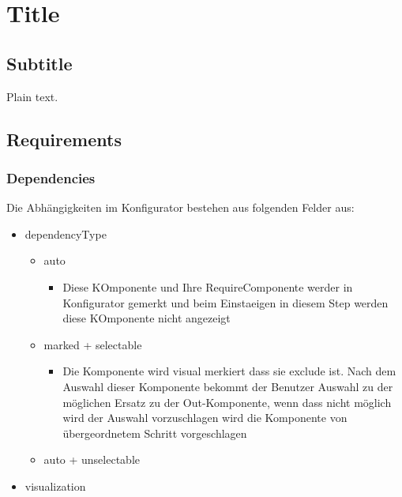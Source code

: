 \documentclass{article}
\begin{document}
\section{Title}

\subsection{Subtitle}

Plain text.

\subsection{Requirements}

\subsubsection{Dependencies}

Die Abhängigkeiten im Konfigurator bestehen aus folgenden Felder aus:

\begin{itemize} 
\item dependencyType
\begin{itemize}
  \item auto 
    \begin{itemize}
      \item Diese KOmponente und Ihre RequireComponente werder in Konfigurator
      gemerkt und beim Einstaeigen in diesem Step werden diese KOmponente nicht
      angezeigt
    
    \end{itemize}
  \item marked + selectable
  \begin{itemize}
    \item Die Komponente wird visual merkiert dass sie exclude ist. Nach dem
    Auswahl dieser Komponente bekommt der Benutzer Auswahl zu der möglichen
    Ersatz zu der Out-Komponente, wenn dass nicht möglich wird der Auswahl
    vorzuschlagen wird die Komponente von übergeordnetem Schritt
    vorgeschlagen
    
  \end{itemize}
  \item auto + unselectable
\end{itemize}
\item visualization

\end{itemize}
\end{document}
